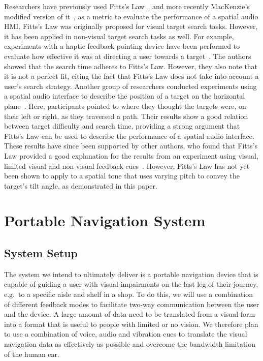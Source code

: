 \documentclass[sigconf, review=true, screen=true, anonymous=true]{acmart}
\begin{document}
Researchers have previously used Fitts's Law~\cite{fitts1954information}, and more recently MacKenzie's modified version of it~\cite{mackenzie1992fitts}, as a metric to evaluate the performance of a spatial audio HMI\@. Fitts's Law was originally proposed for visual target search tasks. However, it has been applied in non-visual target search tasks as well. For example, experiments with a haptic feedback pointing device have been performed to evaluate how effective it was at directing a user towards a target~\cite{ahmaniemi2009augmented}. The authors showed that the search time adheres to Fitts's Law. However, they also note that it is not a perfect fit, citing the fact that Fitts's Law does not take into account a user's search strategy. Another group of researchers conducted experiments using a spatial audio interface to describe the position of a target on the horizontal plane~\cite{marentakis2006effects}. Here, participants pointed to where they thought the targets were, on their left or right, as they traversed a path. Their results show a good relation between target difficulty and search time, providing a strong argument that Fitts's Law can be used to describe the performance of a spatial audio interface. These results have since been supported by other authors, who found that Fitts's Law provided a good explanation for the results from an experiment using visual, limited visual and non-visual feedback cues~\cite{wu2010fitts}. However, Fitts's Law has not yet been shown to apply to a spatial tone that uses varying pitch to convey the target's tilt angle, as demonstrated in this paper.

\section{Portable Navigation System}
\label{sec:portable-navigation}

\subsection{System Setup}

The system we intend to ultimately deliver is a portable navigation device that is capable of guiding a user with visual impairments on the last leg of their journey, e.g.\ to a specific aisle and shelf in a shop. To do this, we will use a combination of different feedback modes to facilitate two-way communication between the user and the device. A large amount of data need to be translated from a visual form into a format that is useful to people with limited or no vision. We therefore plan to use a combination of voice, audio and vibration cues to translate the visual navigation data as effectively as possible and overcome the bandwidth limitation of the human ear. 
\end{document}
